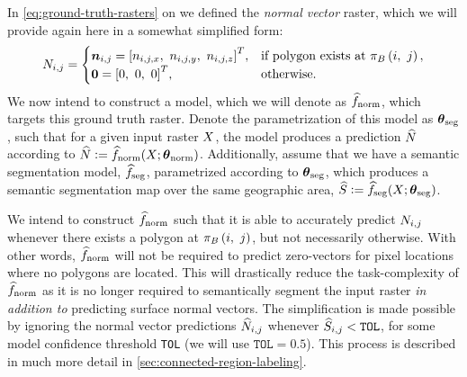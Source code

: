 In \cref{eq:ground-truth-rasters} on  we defined the \emph{normal vector} raster, which we will provide again here in a somewhat simplified form:
%
\begin{equation*}
  N_{i, j}
  =
  \begin{cases}
    \boldsymbol{n}_{i,j} = {\left[ n_{i,j,x},~n_{i,j,y},~n_{i,j,z} \right]}^T, &\text{if polygon exists at } \pi_{B}\left(i,~j\right),\\
    \boldsymbol{0} = {\left[0, ~0, ~0\right]}^T, &\text{otherwise.}
  \end{cases}
\end{equation*}
%
We now intend to construct a model, which we will denote as $\widehat{f}_{\mathrm{norm}}$, which targets this ground truth raster.
Denote the parametrization of this model as $\boldsymbol{\theta}_{\mathrm{seg}}$, such that for a given input raster $X$, the model produces a prediction $\widehat{N}$ according to $\widehat{N} \vcentcolon= \widehat{f}_{\mathrm{norm}}(X; \boldsymbol{\theta}_{\mathrm{norm}})$.
Additionally, assume that we have a semantic segmentation model, $\widehat{f}_{\mathrm{seg}}$, parametrized according to $\boldsymbol{\theta}_{\mathrm{seg}}$, which produces a semantic segmentation map over the same geographic area, $\widehat{S} \vcentcolon= \widehat{f}_{\mathrm{seg}}(X; \boldsymbol{\theta}_{\mathrm{seg}})$.

We intend to construct $\widehat{f}_{\mathrm{norm}}$ such that it is able to accurately predict $N_{i,j}$ whenever there exists a polygon at $\pi_{B}\left(i,~j\right)$, but not necessarily otherwise.
With other words, $\widehat{f}_{\mathrm{norm}}$ will not be required to predict zero-vectors for pixel locations where no polygons are located.
This will drastically reduce the task-complexity of $\widehat{f}_{\mathrm{norm}}$ as it is no longer required to semantically segment the input raster \emph{in addition to} predicting surface normal vectors.
The simplification is made possible by ignoring the normal vector predictions $\widehat{N}_{i,j}$ whenever $\widehat{S}_{i,j} < \texttt{TOL}$, for some model confidence threshold \texttt{TOL} (we will use $\texttt{TOL} = 0.5$).
This process is described in much more detail in \cref{sec:connected-region-labeling}.

